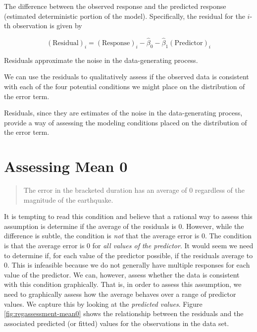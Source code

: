 \documentclass[]{book}
\theoremstyle{plain}
\theoremstyle{mydefn}
\theoremstyle{myexmpl}
\theoremstyle{remark}
\let\BeginKnitrBlock\begin \let\EndKnitrBlock\end
\let\BeginKnitrBlock\begin \let\EndKnitrBlock\end
\begin{document}
\BeginKnitrBlock{definition}[Residual]
\protect\hypertarget{def:defn-residual}{}{\label{def:defn-residual}
{} }The difference between the observed response
and the predicted response (estimated deterministic portion of the
model). Specifically, the residual for the \(i\)-th observation is given
by

\[(\text{Residual})_i = (\text{Response})_i - \widehat{\beta}_0 - \widehat{\beta}_1 (\text{Predictor})_{i}\]

Residuals approximate the noise in the data-generating process.
\EndKnitrBlock{definition}

We can use the residuals to qualitatively assess if the observed data is
consistent with each of the four potential conditions we might place on
the distribution of the error term.

\BeginKnitrBlock{rmdkeyidea}
Residuals, since they are estimates of the noise in the data-generating
process, provide a way of assessing the modeling conditions placed on
the distribution of the error term.
\EndKnitrBlock{rmdkeyidea}

\section{Assessing Mean 0}\label{assessing-mean-0}

\begin{quote}
The error in the bracketed duration has an average of 0 regardless of
the magnitude of the earthquake.
\end{quote}

It is tempting to read this condition and believe that a rational way to
assess this assumption is determine if the average of the residuals is
0. However, while the difference is subtle, the condition is \emph{not}
that the average error is 0. The condition is that the average error is
0 for \emph{all values of the predictor}. It would seem we need to
determine if, for each value of the predictor possible, if the residuals
average to 0. This is infeasible because we do not generally have
multiple responses for each value of the predictor. We can, however,
assess whether the data is consistent with this condition graphically.
That is, in order to assess this assumption, we need to graphically
assess how the average behaves over a range of predictor values. We
capture this by looking at the \emph{predicted values}. Figure
\ref{fig:regassessment-mean0} shows the relationship between the
residuals and the associated predicted (or fitted) values for the
observations in the data set.
\end{document}
